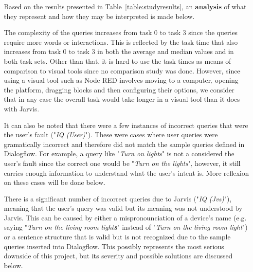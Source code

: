 \documentclass[runningheads]{llncs}
\begin{document}
Based on the results presented in Table~\ref{table:studyresults}, an \textbf{analysis} of what they represent and how they may be interpreted is made below.

The complexity of the queries increases from task 0 to task 3 since the queries require more words or interactions. This is reflected by the task time that also increases from task 0 to task 3 in both the average and median values and in both task sets. Other than that, it is hard to use the task times as means of comparison to visual tools since no comparison study was done. However, since using a visual tool such as Node-RED involves moving to a computer, opening the platform, dragging blocks and then configuring their options, we consider that in any case the overall task would take longer in a visual tool than it does with Jarvis.


It can also be noted that there were a few instances of incorrect queries that were the user's fault ("\textit{IQ (User)}"). These were cases where user queries were gramatically incorrect and therefore did not match the sample queries defined in Dialogflow. For example, a query like "\textit{Turn on lights}" is not a considered the user's fault since the correct one would be "\textit{Turn on the lights}", however, it still carries enough information to understand what the user's intent is. More reflexion on these cases will be done below.

There is a significant number of incorrect queries due to Jarvis ("\textit{IQ (Jvs)}"), meaning that the user's query was valid but its meaning was not understood by Jarvis. This can be caused by either a mispronounciation of a device's name (e.g. saying "\textit{Turn on the living room light\textbf{s}}" instead of "\textit{Turn on the living room light}") or a sentence structure that is valid but is not recognized due to the sample queries inserted into Dialogflow. This possibly represents the most serious downside of this project, but its severity and possible solutions are discussed below.
\end{document}

